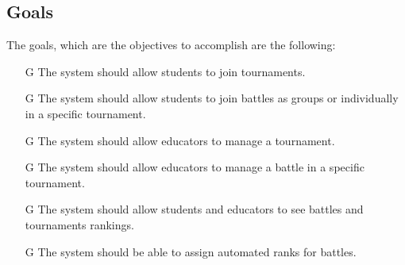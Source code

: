 \documentclass[12pt, a4paper]{report}
\newcounter{goals}
\begin{document}
    \subsection{Goals}
    The goals, which are the objectives to accomplish are the following: 
    \begin{enumerate}
        \item [G\arabic{goals}\stepcounter{goals}] The system should allow students to join tournaments.
        \item [G\arabic{goals}\stepcounter{goals}] The system should allow students to join battles as groups or individually in a specific tournament.
        \item [G\arabic{goals}\stepcounter{goals}] The system should allow educators to manage a tournament.
        \item [G\arabic{goals}\stepcounter{goals}] The system should allow educators to manage a battle in a specific tournament.
        \item [G\arabic{goals}\stepcounter{goals}] The system should allow students and educators to see battles and tournaments rankings.
        \item [G\arabic{goals}\stepcounter{goals}] The system should be able to assign automated ranks for battles.
    \end{enumerate}
\end{document}
